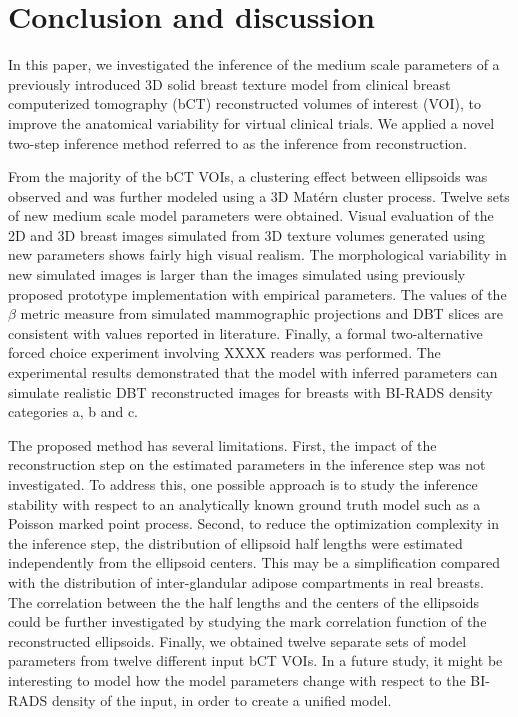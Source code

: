 \documentclass[journal]{IEEEtran}
\begin{document}
\section{Conclusion and discussion}
\label{sec:concl-disc}

In this paper, we investigated the inference of the medium scale
parameters of a previously introduced 3D solid breast texture model
from clinical breast computerized tomography (bCT) reconstructed
volumes of interest (VOI), to improve the anatomical variability for
virtual clinical trials. We applied a novel two-step inference method
referred to as the inference from reconstruction.

From the majority of the bCT VOIs, a clustering effect between
ellipsoids was observed and was further modeled using a 3D Mat\'{e}rn
cluster process. Twelve sets of new medium scale model parameters were
obtained. Visual evaluation of the 2D and 3D breast images simulated
from 3D texture volumes generated using new parameters shows fairly
high visual realism. The morphological variability in new simulated
images is larger than the images simulated using previously proposed
prototype implementation with empirical parameters. The values of the
$\beta$ metric measure from simulated mammographic projections and DBT
slices are consistent with values reported in literature. Finally, a
formal two-alternative forced choice experiment involving XXXX readers
was performed. The experimental results demonstrated that the model
with inferred parameters can simulate realistic DBT reconstructed
images for breasts with BI-RADS density categories a, b and c.

The proposed method has several limitations. First, the impact of the
reconstruction step on the estimated parameters in the inference step
was not investigated. To address this, one possible approach is to
study the inference stability with respect to an analytically known
ground truth model such as a Poisson marked point process. Second, to
reduce the optimization complexity in the inference step, the
distribution of ellipsoid half lengths were estimated independently
from the ellipsoid centers. This may be a simplification compared with
the distribution of inter-glandular adipose compartments in real
breasts. The correlation between the the half lengths and the centers
of the ellipsoids could be further investigated by studying the mark
correlation function of the reconstructed ellipsoids. Finally, we
obtained twelve separate sets of model parameters from twelve
different input bCT VOIs. In a future study, it might be interesting
to model how the model parameters change with respect to the BI-RADS
density of the input, in order to create a unified model.
\end{document}
